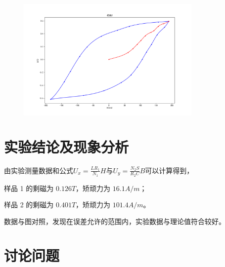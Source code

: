 \documentclass[signature=data]{physicsreport}
\begin{document}
\begin{figure}[H]
    \centering
    \includegraphics[width=0.8\textwidth]{images/lab15/Figure_2.png}
\end{figure}

\newpage

\section{实验结论及现象分析}

由实验测量数据和公式$U_x=\frac{LR_1}{N_1}H$与$U_y=\frac{N_2S}{R_2C}B$可以计算得到，

样品 1 的剩磁为 $0.126 T$，矫顽⼒为 $16.1 A/m$；

样品 2 的剩磁为 $0.401 T$，矫顽⼒为 $101.4 A/m$。

数据与图对照，发现在误差允许的范围内，实验数据与理论值符合较好。



\section{讨论问题}
\end{document}
